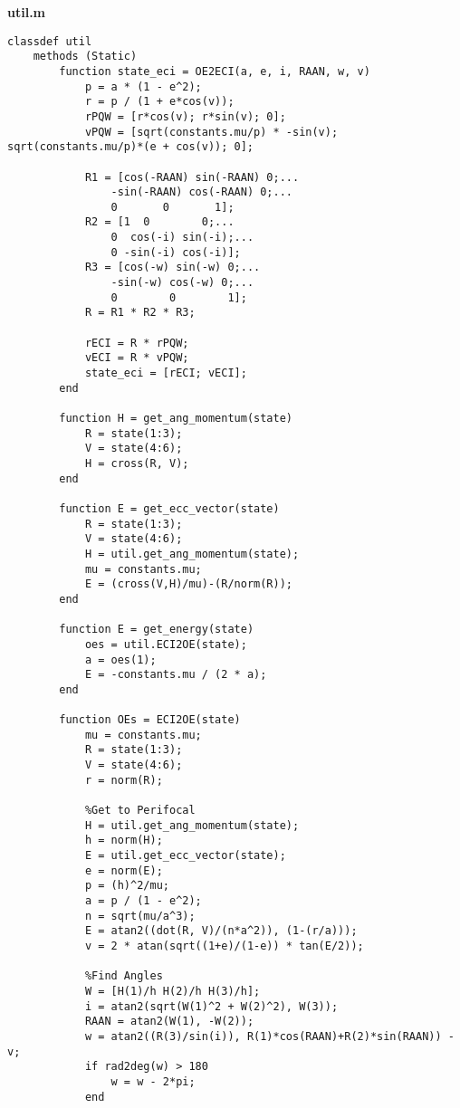 \textbf{util.m}
\begin{lstlisting}
classdef util
    methods (Static)
        function state_eci = OE2ECI(a, e, i, RAAN, w, v)
            p = a * (1 - e^2);
            r = p / (1 + e*cos(v));
            rPQW = [r*cos(v); r*sin(v); 0];
            vPQW = [sqrt(constants.mu/p) * -sin(v); sqrt(constants.mu/p)*(e + cos(v)); 0];
        
            R1 = [cos(-RAAN) sin(-RAAN) 0;...
                -sin(-RAAN) cos(-RAAN) 0;...
                0       0       1];
            R2 = [1  0        0;...
                0  cos(-i) sin(-i);...
                0 -sin(-i) cos(-i)];
            R3 = [cos(-w) sin(-w) 0;...
                -sin(-w) cos(-w) 0;...
                0        0        1];
            R = R1 * R2 * R3;
        
            rECI = R * rPQW;
            vECI = R * vPQW;
            state_eci = [rECI; vECI];
        end

        function H = get_ang_momentum(state)
            R = state(1:3);
            V = state(4:6);
            H = cross(R, V);
        end

        function E = get_ecc_vector(state)
            R = state(1:3);
            V = state(4:6);
            H = util.get_ang_momentum(state);
            mu = constants.mu;
            E = (cross(V,H)/mu)-(R/norm(R));
        end

        function E = get_energy(state)
            oes = util.ECI2OE(state);
            a = oes(1);
            E = -constants.mu / (2 * a);
        end

        function OEs = ECI2OE(state)
            mu = constants.mu;
            R = state(1:3);
            V = state(4:6);
            r = norm(R);
            
            %Get to Perifocal
            H = util.get_ang_momentum(state);
            h = norm(H);
            E = util.get_ecc_vector(state);
            e = norm(E);
            p = (h)^2/mu;
            a = p / (1 - e^2);
            n = sqrt(mu/a^3);
            E = atan2((dot(R, V)/(n*a^2)), (1-(r/a)));
            v = 2 * atan(sqrt((1+e)/(1-e)) * tan(E/2));
            
            %Find Angles
            W = [H(1)/h H(2)/h H(3)/h];
            i = atan2(sqrt(W(1)^2 + W(2)^2), W(3));
            RAAN = atan2(W(1), -W(2));
            w = atan2((R(3)/sin(i)), R(1)*cos(RAAN)+R(2)*sin(RAAN)) - v;
            if rad2deg(w) > 180
                w = w - 2*pi;
            end
            

\end{lstlisting}
